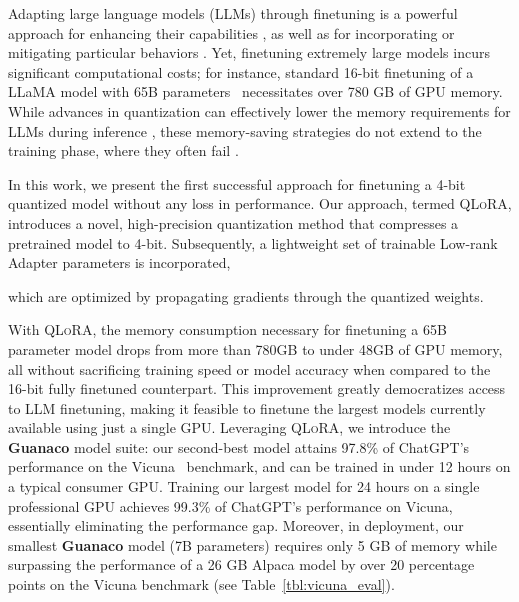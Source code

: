 Adapting large language models (LLMs) through finetuning is a powerful approach for enhancing their capabilities \citep{min2021metaicl, wei2021finetuned, ouyang2022training, wang2022super, wang2022self, liu2022few}, as well as for incorporating or mitigating particular behaviors \citep{ouyang2022training,askell2021general,bai2022training}. Yet, finetuning extremely large models incurs significant computational costs; for instance, standard 16-bit finetuning of a LLaMA model with 65B parameters~\citep{touvron2023llama} necessitates over 780 GB of GPU memory. While advances in quantization can effectively lower the memory requirements for LLMs during inference \citep{dettmers2022llm, dettmers2022case, frantar2022gptq, xiao2022smoothquant}, these memory-saving strategies do not extend to the training phase, where they often fail \citep{wortsman2023stable}.

In this work, we present the first successful approach for finetuning a 4-bit quantized model without any loss in performance. Our approach, termed \textsc{QLoRA}, introduces a novel, high-precision quantization method that compresses a pretrained model to 4-bit. Subsequently, a lightweight set of trainable Low-rank Adapter parameters \citep{hu2021lora} is incorporated, 

which are optimized by propagating gradients through the quantized weights.

With \textsc{QLoRA}, the memory consumption necessary for finetuning a 65B parameter model drops from more than 780GB to under 48GB of GPU memory, all without sacrificing training speed or model accuracy when compared to the 16-bit fully finetuned counterpart. This improvement greatly democratizes access to LLM finetuning, making it feasible to finetune the largest models currently available using just a single GPU. Leveraging \textsc{QLoRA}, we introduce the \textbf{Guanaco} model suite: our second-best model attains 97.8\% of ChatGPT’s performance on the Vicuna~\citep{vicuna2023} benchmark, and can be trained in under 12 hours on a typical consumer GPU. Training our largest model for 24 hours on a single professional GPU achieves 99.3\% of ChatGPT’s performance on Vicuna, essentially eliminating the performance gap. Moreover, in deployment, our smallest \textbf{Guanaco} model (7B parameters) requires only 5 GB of memory while surpassing the performance of a 26 GB Alpaca model by over 20 percentage points on the Vicuna benchmark (see Table~\ref{tbl:vicuna_eval}).

